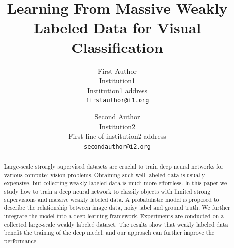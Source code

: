 \documentclass[10pt,twocolumn,letterpaper]{article}
\begin{document}

\title{Learning From Massive Weakly Labeled Data for Visual Classification}

\author{First Author\\
Institution1\\
Institution1 address\\
{\tt\small firstauthor@i1.org}
\and
Second Author\\
Institution2\\
First line of institution2 address\\
{\tt\small secondauthor@i2.org}
}

\maketitle

\begin{abstract}
Large-scale strongly supervised datasets are crucial to train deep neural networks for various computer vision problems. Obtaining such well labeled data is usually expensive, but collecting weakly labeled data is much more effortless. In this paper we study how to train a deep neural network to classify objects with limited strong supervisions and massive weakly labeled data. A probabilistic model is proposed to describe the relationship between image data, noisy label and ground truth. We further integrate the model into a deep learning framework. Experiments are conducted on a collected large-scale weakly labeled dataset. The results show that weakly labeled data benefit the training of the deep model, and our approach can further improve the performance.
\end{abstract}

\end{document}
